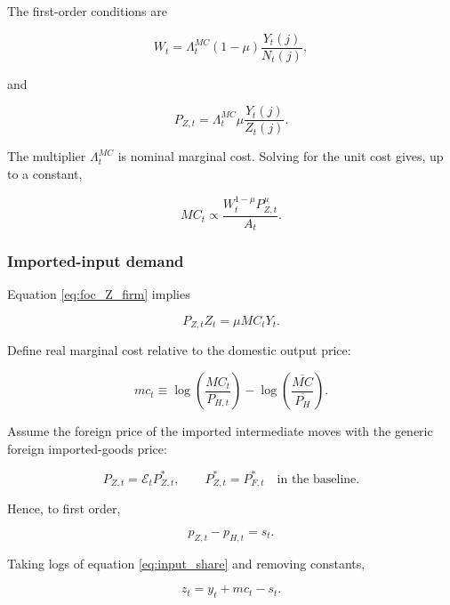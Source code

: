 The first-order conditions are

\begin{equation}
W_t
=
\Lambda_t^{MC}
(1-\mu)
\frac{Y_t(j)}{N_t(j)},
\label{eq:foc_N_firm}
\end{equation}

and

\begin{equation}
P_{Z,t}
=
\Lambda_t^{MC}
\mu
\frac{Y_t(j)}{Z_t(j)}.
\label{eq:foc_Z_firm}
\end{equation}

The multiplier \(\Lambda_t^{MC}\) is nominal marginal cost. Solving for the unit
cost gives, up to a constant,

\begin{equation}
MC_t
\propto
\frac{
W_t^{1-\mu}P_{Z,t}^{\mu}
}{A_t}.
\label{eq:unitcost}
\end{equation}

\subsubsection{Imported-input demand}

Equation \eqref{eq:foc_Z_firm} implies

\begin{equation}
P_{Z,t}Z_t
=
\mu MC_tY_t.
\label{eq:input_share}
\end{equation}

Define real marginal cost relative to the domestic output price:

\[
mc_t
\equiv
\log\left(\frac{MC_t}{P_{H,t}}\right)
-
\log\left(\frac{\overline{MC}}{\overline{P_H}}\right).
\]

Assume the foreign price of the imported intermediate moves with the generic
foreign imported-goods price:

\begin{equation}
P_{Z,t}
=
\mathcal E_tP_{Z,t}^{*},
\qquad
P_{Z,t}^{*}=P_{F,t}^{*}
\quad\text{in the baseline}.
\label{eq:pz}
\end{equation}

Hence, to first order,

\begin{equation}
p_{Z,t}-p_{H,t}=s_t.
\end{equation}

Taking logs of equation \eqref{eq:input_share} and removing constants,

\begin{equation}
\boxed{
z_t
=
y_t+mc_t-s_t.
}
\label{eq:z_final}
\end{equation}


